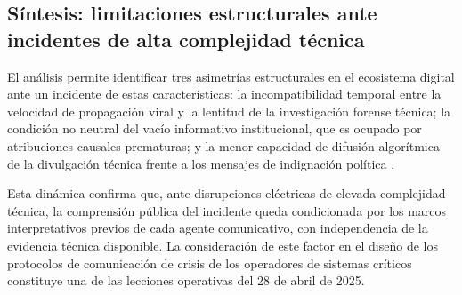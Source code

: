 \subsection*{Síntesis: limitaciones estructurales ante incidentes
de alta complejidad técnica}

El análisis permite identificar tres asimetrías estructurales en el
ecosistema digital ante un incidente de estas características: la
incompatibilidad temporal entre la velocidad de propagación viral y
la lentitud de la investigación forense técnica; la condición no
neutral del vacío informativo institucional, que es ocupado por
atribuciones causales prematuras; y la menor capacidad de difusión
algorítmica de la divulgación técnica frente a los mensajes de
indignación política \cite{gobierno2025,blackswan2025}.

Esta dinámica confirma que, ante disrupciones eléctricas de elevada
complejidad técnica, la comprensión pública del incidente queda
condicionada por los marcos interpretativos previos de cada agente
comunicativo, con independencia de la evidencia técnica disponible.
La consideración de este factor en el diseño de los protocolos de
comunicación de crisis de los operadores de sistemas críticos
constituye una de las lecciones operativas del 28 de abril de 2025.